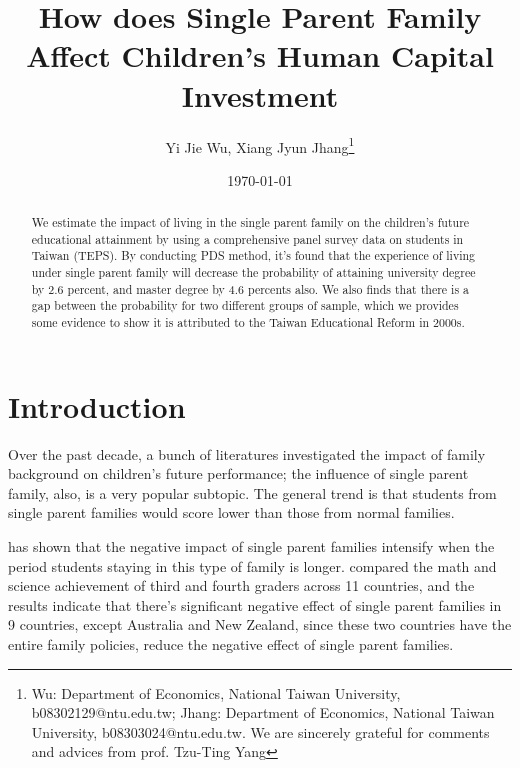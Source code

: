 \documentclass[]{AEA}
\begin{document}
\title{How does Single Parent Family Affect Children's Human Capital Investment}
\author{Yi Jie Wu, Xiang Jyun Jhang\thanks{Wu: Department of Economics, National Taiwan University, b08302129@ntu.edu.tw; Jhang: Department of Economics, National Taiwan University, b08303024@ntu.edu.tw.  We are sincerely grateful for comments and advices from prof. Tzu-Ting Yang}}
\date{\today}

\begin{abstract}
    We estimate the impact of living in the single parent family on the children's future educational attainment by using a comprehensive panel survey data on students in Taiwan (TEPS).  By conducting PDS method, it's found that the experience of living under single parent family will decrease the probability of attaining university degree by 2.6 percent, and master degree by 4.6 percents also.  We also finds that there is a gap between the probability for two different groups of sample, which we provides some evidence to show it is attributed to the Taiwan Educational Reform in 2000s.
\end{abstract}


\maketitle

\section{Introduction}

    Over the past decade, a bunch of literatures investigated the impact of family background on children's future performance; the influence of single parent family, also, is a very popular subtopic. The general trend is that students from single parent families would score lower than those from normal families.\citep{barajas2011} 

    \cite{krein1988} has shown that the negative impact of single parent families intensify when the period students staying in this type of family is longer. \cite{pong2003} compared the math and science achievement of third and fourth graders across 11 countries, and the results indicate that there's significant negative effect of single parent families in 9 countries, except Australia and New Zealand, since these two countries have the entire family policies, reduce the negative effect of single parent families.
\end{document}
